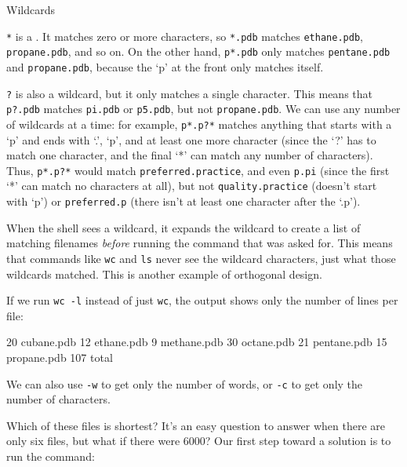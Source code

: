 \documentclass{book}
\begin{document}
\begin{swcbox}{Wildcards}

\texttt{*} is a . It matches zero or more
characters, so \texttt{*.pdb} matches \texttt{ethane.pdb},
\texttt{propane.pdb}, and so on. On the other hand, \texttt{p*.pdb} only
matches \texttt{pentane.pdb} and \texttt{propane.pdb}, because the `p'
at the front only matches itself.

\texttt{?} is also a wildcard, but it only matches a single character.
This means that \texttt{p?.pdb} matches \texttt{pi.pdb} or
\texttt{p5.pdb}, but not \texttt{propane.pdb}. We can use any number of
wildcards at a time: for example, \texttt{p*.p?*} matches anything that
starts with a `p' and ends with `.', `p', and at least one more
character (since the `?' has to match one character, and the final `*'
can match any number of characters). Thus, \texttt{p*.p?*} would match
\texttt{preferred.practice}, and even \texttt{p.pi} (since the first `*'
can match no characters at all), but not \texttt{quality.practice}
(doesn't start with `p') or \texttt{preferred.p} (there isn't at least
one character after the `.p').

When the shell sees a wildcard, it expands the wildcard to create a list
of matching filenames \emph{before} running the command that was asked
for. This means that commands like \texttt{wc} and \texttt{ls} never see
the wildcard characters, just what those wildcards matched. This is
another example of orthogonal design.

\end{swcbox}

If we run \texttt{wc -l} instead of just \texttt{wc}, the output shows
only the number of lines per file:


\begin{VerbOut}
  20  cubane.pdb
  12  ethane.pdb
   9  methane.pdb
  30  octane.pdb
  21  pentane.pdb
  15  propane.pdb
 107  total
\end{VerbOut}

We can also use \texttt{-w} to get only the number of words, or
\texttt{-c} to get only the number of characters.

Which of these files is shortest? It's an easy question to answer when
there are only six files, but what if there were 6000? Our first step
toward a solution is to run the command:
\end{document}
